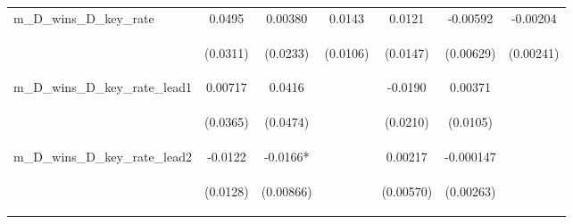 \documentclass[]{article}
\begin{document}
\begin{center}
\begin{tabular}{lcccccc}
m\_D\_wins\_D\_key\_rate & 0.0495 & 0.00380 & 0.0143 & 0.0121 & -0.00592 & -0.00204 \\
\vspace{4pt} & \begin{footnotesize}(0.0311)\end{footnotesize} & \begin{footnotesize}(0.0233)\end{footnotesize} & \begin{footnotesize}(0.0106)\end{footnotesize} & \begin{footnotesize}(0.0147)\end{footnotesize} & \begin{footnotesize}(0.00629)\end{footnotesize} & \begin{footnotesize}(0.00241)\end{footnotesize} \\
m\_D\_wins\_D\_key\_rate\_lead1 & 0.00717 & 0.0416 &  & -0.0190 & 0.00371 &  \\
\vspace{4pt} & \begin{footnotesize}(0.0365)\end{footnotesize} & \begin{footnotesize}(0.0474)\end{footnotesize} & \begin{footnotesize}\end{footnotesize} & \begin{footnotesize}(0.0210)\end{footnotesize} & \begin{footnotesize}(0.0105)\end{footnotesize} & \begin{footnotesize}\end{footnotesize} \\
m\_D\_wins\_D\_key\_rate\_lead2 & -0.0122 & -0.0166* &  & 0.00217 & -0.000147 &  \\
\vspace{4pt} & \begin{footnotesize}(0.0128)\end{footnotesize} & \begin{footnotesize}(0.00866)\end{footnotesize} & \begin{footnotesize}\end{footnotesize} & \begin{footnotesize}(0.00570)\end{footnotesize} & \begin{footnotesize}(0.00263)\end{footnotesize} & \begin{footnotesize}\end{footnotesize} \\

\end{tabular}
\end{center}
\end{document}
